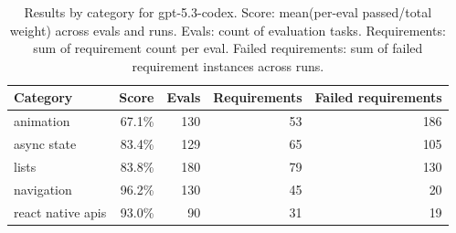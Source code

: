\begin{table}[htbp]
\centering
\begin{tabular}{lrrrr}
\toprule
Category & Score & Evals & Requirements & Failed requirements \\
\midrule
animation & 67.1\% & 130 & 53 & 186 \\
async state & 83.4\% & 129 & 65 & 105 \\
lists & 83.8\% & 180 & 79 & 130 \\
navigation & 96.2\% & 130 & 45 & 20 \\
react native apis & 93.0\% & 90 & 31 & 19 \\
\bottomrule
\end{tabular}
\caption{Results by category for gpt-5.3-codex. Score: mean(per-eval passed/total weight) across evals and runs. Evals: count of evaluation tasks. Requirements: sum of requirement count per eval. Failed requirements: sum of failed requirement instances across runs.}
\end{table}
